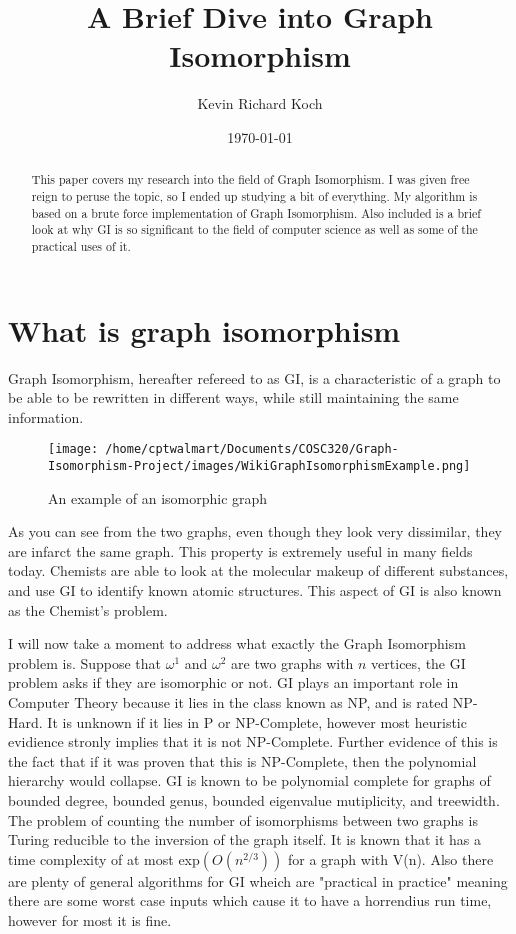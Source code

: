 \documentclass[notitlepage]{report}
\title{A Brief Dive into Graph Isomorphism}
\author{Kevin Richard Koch}
\date{\today}
\begin{document}
\maketitle
\thispagestyle{empty}

\begin{abstract}
This paper covers my research into the field of Graph Isomorphism. I was given free reign to peruse the topic, so I ended up studying a bit of everything. My algorithm is based on a brute force implementation of Graph Isomorphism. Also included is a brief look at why GI is so significant to the field of computer science as well as some of the practical uses of it.
\end{abstract}

\section*{What is graph isomorphism}
Graph Isomorphism, hereafter refereed to as GI, is a characteristic of a graph to be able to be rewritten in different ways, while still maintaining the same information.
\begin{figure}[h!]
\texttt{[image: /home/cptwalmart/Documents/COSC320/Graph-Isomorphism-Project/images/WikiGraphIsomorphismExample.png]}
\caption{An example of an isomorphic graph}
\end{figure}

As you can see from the two graphs, even though they look very dissimilar, they are infarct the same graph. This property is extremely useful in many fields today. Chemists are able to look at the molecular makeup of different substances, and use GI to identify known atomic structures. This aspect of GI is also known as the Chemist's problem.

I will now take a moment to address what exactly the Graph Isomorphism problem is. Suppose that $\omega^{1}$ and $\omega^{2}$ are two graphs with $n$ vertices, the GI problem asks if they are isomorphic or not. GI plays an important role in Computer Theory because it lies in the class known as NP, and is rated NP-Hard. It is unknown if it lies in P or NP-Complete, however most heuristic evidience stronly implies that it is not NP-Complete. Further evidence of this is the fact that if it was proven that this is NP-Complete, then the polynomial hierarchy would collapse. GI is known to be polynomial complete for graphs of bounded degree, bounded genus, bounded eigenvalue mutiplicity, and treewidth. The problem of counting the number of isomorphisms between two graphs is Turing reducible to the inversion of the graph itself. It is known that it has a time complexity of at most exp$(O(n^{2/3}))$ for a graph with V(n). Also there are plenty of general algorithms for GI wheich are "practical in practice" meaning there are some worst case inputs which cause it to have a horrendius run time, however for most it is fine.  ~\cite{derksen, hartke}
\end{document}
